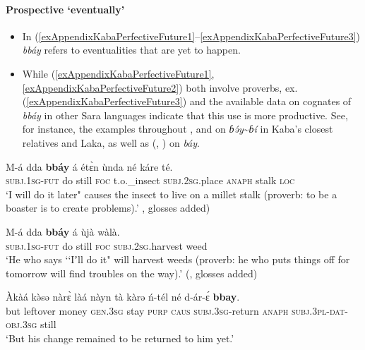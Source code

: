 \paragraph{Prospective \lq eventually\rq}
\label{appendixKabaProspective}
\begin{itemize}
	\item In (\ref{exAppendixKabaPerfectiveFuture1}–\ref{exAppendixKabaPerfectiveFuture3}) \textit{bbáy} refers to eventualities that are yet to happen.
	\item While (\ref{exAppendixKabaPerfectiveFuture1}, \ref{exAppendixKabaPerfectiveFuture2}) both involve proverbs, ex. (\ref{exAppendixKabaPerfectiveFuture3}) and the available data on cognates of \textit{bbáy} in other Sara languages indicate that this use is more productive. See, for instance, the examples throughout \textcite{Keegan2014}, \textcite{Thayer1978} and \textcite{Vandame1963} on \textit{ɓə́y}\sim{}\textit{ɓí} in Kaba's closest relatives  and Laka, as well as \citeauthor{Palayer1989} (\citeyear[244]{Palayer1989}, \citeyear[167]{Palayer1992}) on  \textit{báy}.
\end{itemize}

\begin{exe}
	\ex\label{exAppendixKabaPerfectiveFuture1}
	\gll M-á dda \textbf{bbáy} á étɛ̀n ùnda né káre té.\\
	\textsc{subj}.1\textsc{sg}-\textsc{fut} do still \textsc{foc} t.o.\_insect 	\textsc{subj}.2\textsc{sg}.place \textsc{anaph} stalk \textsc{loc}\\
	\glt {\lq\lq}\lq I will do it later" causes the insect to live on a millet stalk (proverb: to be a boaster is to create problems).\rq{ }\cite[50]{MoserDingatoloum2007}, glosses added)

	\ex\label{exAppendixKabaPerfectiveFuture2}
	\gll M-á dda \textbf{bbáy} á ùjà wàlà.\\
	\textsc{subj}.1\textsc{sg}-\textsc{fut} do still \textsc{foc} \textsc{subj}.2\textsc{sg}.harvest weed\\
\glt \lq He who says \lq\lq Iʼll do it" will harvest weeds (proverb: he who puts things off for tomorrow will find troubles on the way).\rq{ }(\cite[10]{MoserDingatoloum2007}, glosses added)

	\ex\label{exAppendixKabaPerfectiveFuture3}
	\gll Àkàá kə̀sə nàrɛ̀ làá nàyn tà kàrə ń-tél né d-ár-ɛ́ \textbf{bbay}.\\
	but leftover money \textsc{gen}.3\textsc{sg} stay \textsc{purp} \textsc{caus} \textsc{subj}.3\textsc{sg}-return \textsc{anaph} \textsc{subj}.3\textsc{pl}-\textsc{dat}-\textsc{obj}.3\textsc{sg} still\\
	\glt \lq But his change remained to be returned to him yet.\rq{ }\parencite[356]{Moser2004}
\end{exe}

